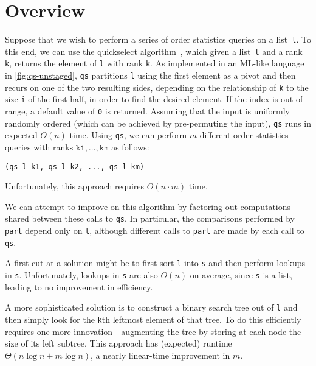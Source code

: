 
\section{Overview}
\label{sec:overview}

\begin{abstrsyn}

Suppose that we wish to perform a series of order statistics queries
on a list~\texttt{l}. To this end, we can use the quickselect
algorithm~\cite{Hoare:1961}, which given a list~\texttt{l} and a rank
\texttt{k}, returns the element of \texttt{l} with rank \texttt{k}.
As implemented in an ML-like language in \ref{fig:qs-unstaged},
\texttt{qs} partitions \texttt{l} using the first element as
a pivot and then recurs on one of the two resulting sides, depending on
the relationship of \texttt{k} to the size \texttt{i} of the first half, in
order to find the desired element.  
If the index is out of range, a default value of \texttt{0} is returned.
Assuming that the input is uniformly
randomly ordered (which can be achieved by pre-permuting the input), \texttt{qs}
runs in expected $O(n)$ time.
%
Using \texttt{qs}, we can perform $m$ different order statistics queries with
ranks $\mathtt{k1},\dots,\mathtt{km}$ as follows:
%
\begin{lstlisting}
(qs l k1, qs l k2, ..., qs l km)
\end{lstlisting}
%
Unfortunately, this approach requires $O(n \cdot m)$ time.

We can attempt to improve on this algorithm by factoring out computations shared
between these calls to \texttt{qs}. In particular, the comparisons performed by
\texttt{part} depend only on \texttt{l}, although different calls to
\texttt{part} are made by each call to \texttt{qs}.

A first cut at a solution might be to first sort \texttt{l} into
\texttt{s} and then perform lookups in \texttt{s}.
Unfortunately, lookups in \texttt{s} are also $O(n)$ on average, since
\texttt{s} is a list, leading to no improvement in efficiency.  

A more sophisticated solution is to construct a binary search
tree out of \texttt{l} and then simply look for the \texttt{k}th
leftmost element of that tree. To do this efficiently requires one more
innovation---augmenting the tree by storing at each node the size of its left
subtree. This approach has (expected) runtime $\Theta(n\log{n} + m\log{n})$, a
nearly linear-time improvement in $m$.


\end{abstrsyn}
